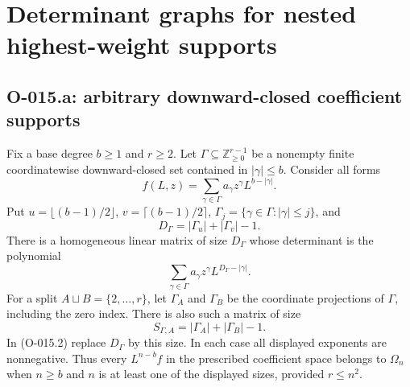 \section{Determinant graphs for nested highest-weight supports}

\subsection{O-015.a: arbitrary downward-closed coefficient supports}
Fix a base degree $b\geq1$ and $r\geq2$. Let
$\Gamma\subseteq\mathbb Z_{\geq0}^{r-1}$ be a nonempty finite
coordinatewise downward-closed set contained in $|\gamma|\leq b$.
Consider all forms
\[
             f(L,z)=\sum_{\gamma\in\Gamma}
                         a_\gamma z^\gamma L^{b-|\gamma|}.
\]
Put $u=\lfloor(b-1)/2\rfloor$, $v=\lceil(b-1)/2\rceil$,
$\Gamma_j=\{\gamma\in\Gamma:|\gamma|\leq j\}$, and
\[
                    D_\Gamma=|\Gamma_u|+|\Gamma_v|-1.
                                                               \tag{O-015.1}
\]
There is a homogeneous linear matrix of size $D_\Gamma$
whose determinant is the polynomial
\[
                 \sum_{\gamma\in\Gamma}
                         a_\gamma z^\gamma L^{D_\Gamma-|\gamma|}.
                                                               \tag{O-015.2}
\]
For a split $A\sqcup B=\{2,\ldots,r\}$, let $\Gamma_A$
and $\Gamma_B$ be the coordinate projections of $\Gamma$,
including the zero index. There is also such a matrix of size
\[
                         S_{\Gamma,A}=|\Gamma_A|+|\Gamma_B|-1.
                                                               \tag{O-015.3}
\]
In (O-015.2) replace $D_\Gamma$ by this size. In each case
all displayed exponents are nonnegative. Thus every
$L^{n-b}f$ in the prescribed coefficient space belongs to
$\Omega_n$ when $n\geq b$ and $n$ is at least one of the
displayed sizes, provided $r\leq n^2$.

